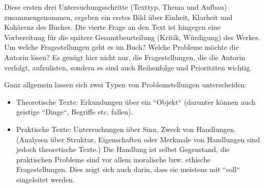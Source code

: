\documentclass[]{book}
\providecommand{\tightlist}{%
  \setlength{\itemsep}{0pt}\setlength{\parskip}{0pt}}
\theoremstyle{definition}
\theoremstyle{definition}
\theoremstyle{definition}
\theoremstyle{remark}
\begin{document}
Diese ersten drei Untersuchungsschritte (Texttyp, Thema und Aufbau)
zusammengenommen, ergeben ein erstes Bild über Einheit, Klarheit und
Kohärenz des Buches. Die vierte Frage an den Text ist hingegen eine
Vorbereitung für die spätere Gesamtbeurteilung (Kritik, Würdigung) des
Werkes. Um welche Fragestellungen geht es im Buch? Welche Probleme
möchte die Autorin lösen? Es genügt hier nicht nur, die Fragestellungen,
die die Autorin verfolgt, aufzulisten, sondern es sind auch Reihenfolge
und Prioritäten wichtig.

Ganz allgemein lassen sich zwei Typen von Problemstellungen
unterscheiden:

\begin{itemize}
\tightlist
\item
  Theoretische Texte: Erkundungen über ein ``Objekt`` (darunter können
  auch geistige ``Dinge``, Begriffe etc. fallen).
\item
  Praktische Texte: Untersuchungen über Sinn, Zweck von Handlungen.
  (Analysen über Struktur, Eigenschaften oder Merkmale von Handlungen
  sind jedoch theoretische Texte.) Die Handlung ist selbst Gegenstand,
  die praktischen Probleme sind vor allem moralische bzw. ethische
  Fragestellungen. Dies zeigt sich auch darin, dass sie meistens mit
  ``soll`` eingeleitet werden.
\end{itemize}
\end{document}
